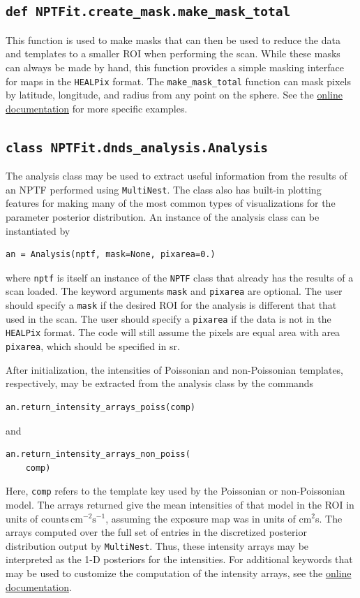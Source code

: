 \subsection*{ \lstinline{def NPTFit.create_mask.make_mask_total} }
 
This function is used to make masks that can then be used to reduce the data and templates to a smaller ROI when performing the scan.  While these masks can always be made by hand, this function provides a simple masking interface for maps in the \texttt{HEALPix} format.  The \lstinline{make_mask_total} function can mask pixels by latitude, longitude, and radius from any point on the sphere.  See the \href{http://nptfit.readthedocs.io}{online documentation} for more specific examples.
 
\subsection*{ \lstinline{class NPTFit.dnds_analysis.Analysis} }
  
The analysis class may be used to extract useful information from the results of an NPTF performed using \texttt{MultiNest}.  The class also has built-in plotting features for making many of the most common types of visualizations for the parameter posterior distribution.  An instance of the analysis class can be instantiated by 
\begin{lstlisting}
an = Analysis(nptf, mask=None, pixarea=0.)
\end{lstlisting}
where \lstinline{nptf} is itself an instance of the \lstinline{NPTF} class that already has the results of a scan loaded.  The keyword arguments \lstinline{mask} and \lstinline{pixarea} are optional. The user should specify a \lstinline{mask} if the desired ROI for the analysis is different that that used in the scan.  The user should specify a \lstinline{pixarea} if the data is not in the \texttt{HEALPix} format.  The code will still assume the pixels are equal area with area \lstinline{pixarea}, which should be specified in sr.   

After initialization, the intensities of Poissonian and non-Poissonian templates, respectively, may be extracted from the analysis class by the commands 
\begin{lstlisting}
an.return_intensity_arrays_poiss(comp) 
\end{lstlisting}
and
\begin{lstlisting}
an.return_intensity_arrays_non_poiss(
    comp)
\end{lstlisting}
Here, \lstinline{comp} refers to the template key used by the Poissonian or non-Poissonian model.  The arrays returned give the mean intensities of that model in the ROI in units of  $\text{counts}\, \text{cm}^{-2}\text{s}^{-1}$, assuming the exposure map was in units of cm$^2$s.  The arrays computed over the full set of entries in the discretized posterior distribution output by \texttt{MultiNest}.  Thus, these intensity arrays may be interpreted as the 1-D posteriors for the intensities.  For additional keywords that may be used to customize the computation of the intensity arrays, see the \href{http://nptfit.readthedocs.io}{online documentation}.

